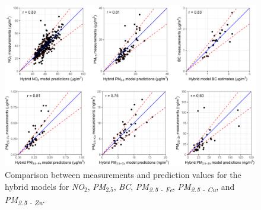 \documentclass{article}
\begin{document}
\captionsetup[figure]{skip=6pt}
\begin{figure}[!htb]
\includegraphics[width=1.0\textwidth]{figures/fig_HM_test_all_models_v2.png}
\caption{Comparison between measurements and prediction values for the hybrid models for \textit{NO$_2$}, \textit{PM$_{2.5}$}, \textit{BC}, \textit{PM\textsubscript{2.5 - Fe}}, \textit{PM\textsubscript{2.5 - Cu}}, and \textit{PM\textsubscript{2.5 - Zn}}.}
\label{fig2}
\end{figure}



%
\end{document}
